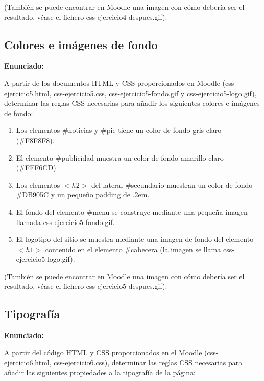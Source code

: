 (También se puede encontrar en Moodle una imagen con cómo debería ser el resultado, 
véase el fichero css-ejercicio4-despues.gif).

\subsection{Colores e imágenes de fondo}
\label{subsec:colores}

\textbf{Enunciado:}

A partir de los documentos HTML y CSS proporcionados en Moodle (css-ejercicio5.html, css-ejercicio5.css, css-ejercicio5-fondo.gif y css-ejercicio5-logo.gif), determinar las reglas CSS necesarias para añadir los siguientes colores e imágenes de fondo:

\begin{enumerate}
  \item Los elementos \#noticias y \#pie tiene un color de fondo gris claro (\#F8F8F8).
  \item El elemento \#publicidad muestra un color de fondo amarillo claro (\#FFF6CD).
  \item Los elementos $<h2>$ del lateral \#secundario muestran un color de fondo \#DB905C y un pequeño padding de .2em.
  \item El fondo del elemento \#menu se construye mediante una pequeña imagen llamada css-ejercicio5-fondo.gif.
  \item El logotipo del sitio se muestra mediante una imagen de fondo del elemento $<h1>$ contenido en el elemento \#cabecera (la imagen se llama css-ejercicio5-logo.gif).
\end{enumerate}

(También se puede encontrar en Moodle una imagen con cómo debería ser el resultado, 
véase el fichero css-ejercicio5-despues.gif).

\subsection{Tipografía}
\label{subsec:tipografia}

\textbf{Enunciado:}

A partir del código HTML y CSS proporcionados en el Moodle (css-ejercicio6.html, css-ejercicio6.css), determinar las reglas CSS necesarias para añadir las siguientes propiedades a la tipografía de la página:

